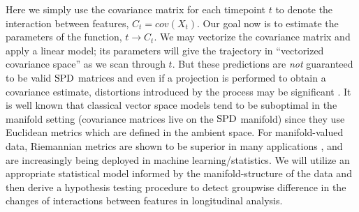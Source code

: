Here we simply use the covariance matrix for each timepoint $t$ to denote the interaction between features, 
$C_t = cov(X_t)$. 
Our goal now is to estimate the parameters of the function, $t \to C_t$. 
We may vectorize the covariance matrix and apply a linear model; its parameters
will give the trajectory in ``vectorized covariance space'' as we scan through $t$. 
But these predictions are {\em not} guaranteed to be valid  $\text{SPD}$ matrices and even if a projection is performed to obtain a covariance estimate, distortions introduced by the process may be significant \citep{fletcher2013geodesic}. 
It is well known that classical vector space models tend to be suboptimal 
in the manifold setting (covariance matrices live on the $\text{SPD}$ manifold)
since they use Euclidean metrics which are defined in the ambient space. For manifold-valued data, Riemannian metrics are shown to be superior in many applications 
\citep{fletcher2007riemannian,banerjee2015nonlinear,jayasumanakernel,tuzel2007human}, 
and are increasingly being deployed in machine learning/statistics. 
We will utilize an appropriate statistical model informed by the manifold-structure of the data and 
then derive a hypothesis 
testing procedure to detect groupwise difference in the changes of interactions between features in longitudinal analysis.
